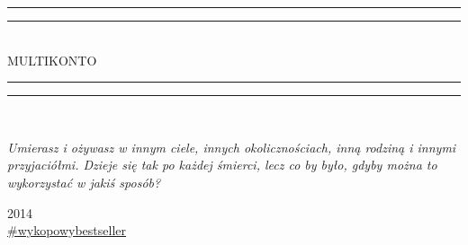 \begin{titlepage}

	\textheight
	\centering
	\vspace*{\baselineskip}
	\rule{\textwidth}{1.6pt}\vspace*{-\baselineskip}\vspace*{2pt}
	\rule{\textwidth}{0.4pt}\\[\baselineskip]
	{\Huge MULTIKONTO}\\[0.2\baselineskip]
	\rule{\textwidth}{0.4pt}\vspace*{-\baselineskip}\vspace{3.2pt}
	\rule{\textwidth}{1.6pt}\\[\baselineskip]
	\vspace{18pt}
	{\itshape\small
	Umierasz i ożywasz w innym ciele, innych okolicznościach, inną rodziną i innymi przyjaciółmi. Dzieje się tak po każdej śmierci, lecz co by było, gdyby można to wykorzystać w jakiś sposób?\par}
	\vfill
	2014 \\
	{\large\href{http://www.wykop.pl/tag/wykopowybestseller}{\#wykopowybestseller}}\par

\end{titlepage}
